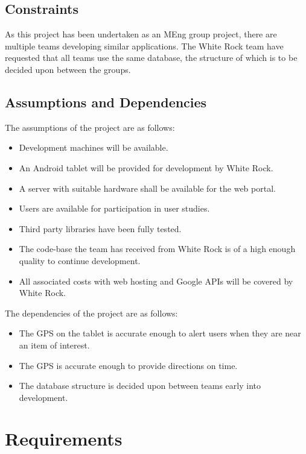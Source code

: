 \documentclass[11pt,a4paper]{article}
\begin{document}
\subsection{Constraints}
\label{sec:constraints}
As this project has been undertaken as an MEng group project, there are multiple teams developing similar applications. The White Rock team have requested that all teams use the same database, the structure of which is to be decided upon between the groups.

\subsection{Assumptions and Dependencies}
\label{sec:assumptions-dependencies}
The assumptions of the project are as follows:

\begin{itemize}
\item Development machines will be available.
\item An Android tablet will be provided for development by White Rock.
\item A server with suitable hardware shall be available for the web portal.
\item Users are available for participation in user studies.
\item Third party libraries have been fully tested.
\item The code-base the team has received from White Rock is of a high enough quality to continue development.
\item All associated costs with web hosting and Google APIs will be covered by White Rock.
\end{itemize}
The dependencies of the project are as follows:
\begin{itemize}
\item The GPS on the tablet is accurate enough to alert users when they are near an item of interest.
\item The GPS is accurate enough to provide directions on time.
\item The database structure is decided upon between teams early into development.
\end{itemize}

\section{Requirements}
\label{sec:requirements}
\end{document}
